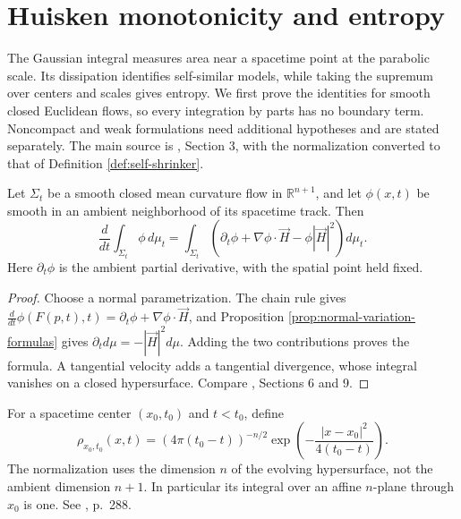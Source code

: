 \chapter{Huisken monotonicity and entropy}\label{sec:mcf-monotonicity}
The Gaussian integral measures area near a spacetime point at the parabolic scale. Its dissipation identifies self-similar models, while taking the supremum over centers and scales gives entropy. We first prove the identities for smooth closed Euclidean flows, so every integration by parts has no boundary term. Noncompact and weak formulations need additional hypotheses and are stated separately. The main source is \cite{Hui90}, Section 3, with the normalization converted to that of Definition \ref{def:self-shrinker}.

\begin{proposition}\label{prop:mcf-test-transport}
Let $\Sigma_t$ be a smooth closed mean curvature flow in $\mathbb R^{n+1}$, and let $\phi(x,t)$ be smooth in an ambient neighborhood of its spacetime track. Then
\[
 \frac{d}{dt}\int_{\Sigma_t}\phi\,d\mu_t
 =\int_{\Sigma_t}\left(\partial_t\phi+\nabla\phi\cdot\vec H-\phi|\vec H|^2\right)d\mu_t.
\]
Here $\partial_t\phi$ is the ambient partial derivative, with the spatial point held fixed.
\end{proposition}
\begin{proof}
Choose a normal parametrization. The chain rule gives $\frac{d}{dt}\phi(F(p,t),t)=\partial_t\phi+\nabla\phi\cdot\vec H$, and Proposition \ref{prop:normal-variation-formulas} gives $\partial_t d\mu=-|\vec H|^2d\mu$. Adding the two contributions proves the formula. A tangential velocity adds a tangential divergence, whose integral vanishes on a closed hypersurface. Compare \cite{WhiMCF15}, Sections 6 and 9.
\end{proof}

\begin{definition}\label{def:mcf-backward-gaussian}
For a spacetime center $(x_0,t_0)$ and $t<t_0$, define
\[
 \rho_{x_0,t_0}(x,t)=(4\pi(t_0-t))^{-n/2}
 \exp\left(-\frac{|x-x_0|^2}{4(t_0-t)}\right).
\]
The normalization uses the dimension $n$ of the evolving hypersurface, not the ambient dimension $n+1$. In particular its integral over an affine $n$-plane through $x_0$ is one. See \cite{Hui90}, p.~288.
\end{definition}

